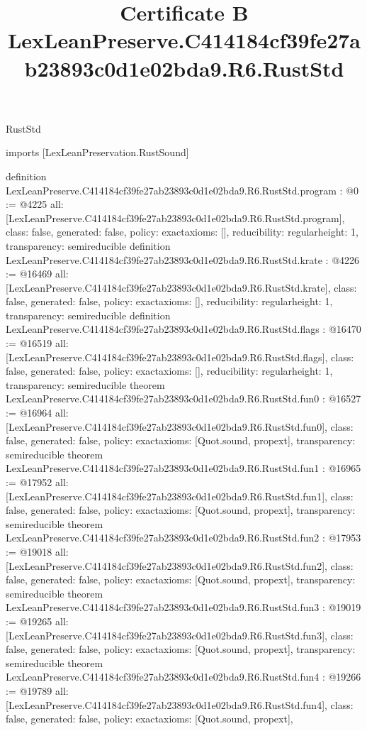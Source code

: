 \begin{lexlean}{RustStd}
\title{Certificate B LexLeanPreserve.C414184cf39fe27ab23893c0d1e02bda9.R6.RustStd}
\begin{coremodule}
imports [LexLeanPreservation.RustSound]

definition LexLeanPreserve.C414184cf39fe27ab23893c0d1e02bda9.R6.RustStd.program : @0 := @4225 {
  all: [LexLeanPreserve.C414184cf39fe27ab23893c0d1e02bda9.R6.RustStd.program],
  class: false,
  generated: false,
  policy: exact{axioms: []},
  reducibility: regular{height: 1},
  transparency: semireducible
}
definition LexLeanPreserve.C414184cf39fe27ab23893c0d1e02bda9.R6.RustStd.krate : @4226 := @16469 {
  all: [LexLeanPreserve.C414184cf39fe27ab23893c0d1e02bda9.R6.RustStd.krate],
  class: false,
  generated: false,
  policy: exact{axioms: []},
  reducibility: regular{height: 1},
  transparency: semireducible
}
definition LexLeanPreserve.C414184cf39fe27ab23893c0d1e02bda9.R6.RustStd.flags : @16470 := @16519 {
  all: [LexLeanPreserve.C414184cf39fe27ab23893c0d1e02bda9.R6.RustStd.flags],
  class: false,
  generated: false,
  policy: exact{axioms: []},
  reducibility: regular{height: 1},
  transparency: semireducible
}
theorem LexLeanPreserve.C414184cf39fe27ab23893c0d1e02bda9.R6.RustStd.fun0 : @16527 := @16964 {
  all: [LexLeanPreserve.C414184cf39fe27ab23893c0d1e02bda9.R6.RustStd.fun0],
  class: false,
  generated: false,
  policy: exact{axioms: [Quot.sound, propext]},
  transparency: semireducible
}
theorem LexLeanPreserve.C414184cf39fe27ab23893c0d1e02bda9.R6.RustStd.fun1 : @16965 := @17952 {
  all: [LexLeanPreserve.C414184cf39fe27ab23893c0d1e02bda9.R6.RustStd.fun1],
  class: false,
  generated: false,
  policy: exact{axioms: [Quot.sound, propext]},
  transparency: semireducible
}
theorem LexLeanPreserve.C414184cf39fe27ab23893c0d1e02bda9.R6.RustStd.fun2 : @17953 := @19018 {
  all: [LexLeanPreserve.C414184cf39fe27ab23893c0d1e02bda9.R6.RustStd.fun2],
  class: false,
  generated: false,
  policy: exact{axioms: [Quot.sound, propext]},
  transparency: semireducible
}
theorem LexLeanPreserve.C414184cf39fe27ab23893c0d1e02bda9.R6.RustStd.fun3 : @19019 := @19265 {
  all: [LexLeanPreserve.C414184cf39fe27ab23893c0d1e02bda9.R6.RustStd.fun3],
  class: false,
  generated: false,
  policy: exact{axioms: [Quot.sound, propext]},
  transparency: semireducible
}
theorem LexLeanPreserve.C414184cf39fe27ab23893c0d1e02bda9.R6.RustStd.fun4 : @19266 := @19789 {
  all: [LexLeanPreserve.C414184cf39fe27ab23893c0d1e02bda9.R6.RustStd.fun4],
  class: false,
  generated: false,
  policy: exact{axioms: [Quot.sound, propext]},
}
\end{coremodule}
\end{lexlean}
